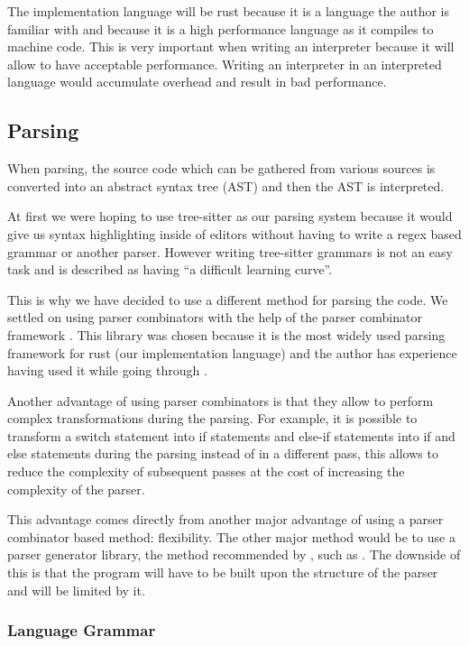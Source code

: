 \documentclass{article}
\begin{document}
The implementation language will be rust because it is a language the author is
familiar with and because it is a high performance language as it compiles to
machine code. This is very important when writing an interpreter because it
will allow to have acceptable performance. Writing an interpreter in an
interpreted language would accumulate overhead and result in bad performance.

\subsection{Parsing}

When parsing, the source code which can be gathered from various sources is
converted into an abstract syntax tree (AST) and then the AST is interpreted.

At first we were hoping to use tree-sitter as our parsing system because it
would give us syntax highlighting inside of editors without having to write a
regex based grammar or another parser. However writing tree-sitter grammars is
not an easy task and is described as having ``a difficult learning
curve''\cite{ts_creating_parsers}.

This is why we have decided to use a different method for parsing the code. We
settled on using parser combinators with the help of the parser combinator
framework . This library was chosen because it is the most widely
used parsing framework for rust (our implementation language) and the author
has experience having used it while going through \textcite{eopl}.

Another advantage of using parser combinators is that they allow to perform
complex transformations during the parsing. For example, it is possible to
transform a switch statement into if statements and else-if statements into
if and else statements during the parsing instead of in a different pass, this
allows to reduce the complexity of subsequent passes at the cost of increasing
the complexity of the parser.

This advantage comes directly from another major advantage of using a parser
combinator based method: flexibility. The other major method would be to use a
parser generator library, the method recommended by \textcite{eopl}, such as
\textcite{bison}. The downside of this is that the program will have to be
built upon the structure of the parser and will be limited by it.

\subsubsection{Language Grammar}
\end{document}
